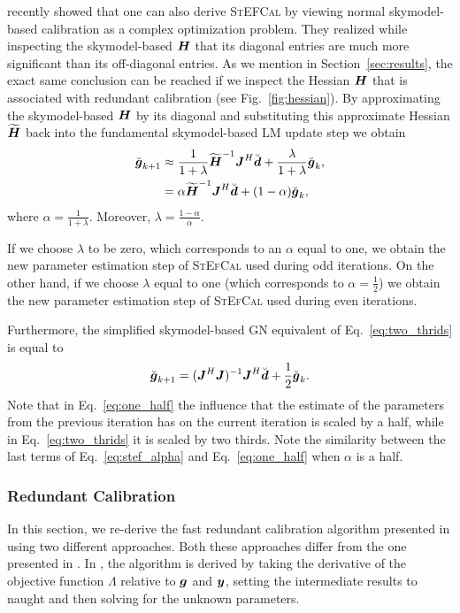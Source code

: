 \documentclass[useAMS,usenatbib]{mn2e}
\newcommand{\bg}{\bmath{g}}
\newcommand{\bd}{\bmath{d}}
\newcommand{\by}{\bmath{y}}
\newcommand{\bJ}{\bmath{J}}
\newcommand{\bH}{\bmath{H}}
\begin{document}
\citet{Smirnov2015} recently showed that one can also derive \textsc{StEFCal} by viewing normal skymodel-based calibration as a complex optimization problem.
They realized while inspecting the skymodel-based $\bH$ that its diagonal entries are much more significant than its off-diagonal entries.
As we mention in Section~\ref{sec:results}, the exact same conclusion can be reached if we inspect the Hessian $\bH$ that is associated with redundant calibration (see Fig.~\ref{fig:hessian}). 
By approximating the skymodel-based $\bH$ by its diagonal and substituting this approximate Hessian $\widetilde{\bH}$ back into the fundamental skymodel-based LM update step we obtain \citep{Smirnov2015} 
\begin{align}
\breve{\bg}_{k+1} &\approx \frac{1}{1+\lambda}\widetilde{\bH}^{-1}\bJ^H\breve{\bd} + \frac{\lambda}{1+\lambda} \breve{\bg}_k,\label{eq:stef_lambda}\\
 &= \alpha \widetilde{\bH}^{-1}\bJ^H\breve{\bd} + (1-\alpha)\breve{\bg}_k, \label{eq:stef_alpha}  
\end{align}
where $\alpha = \frac{1}{1+\lambda}$. Moreover, $\lambda = \frac{1-\alpha}{\alpha}$.

If we choose $\lambda$ to be zero, which corresponds to an $\alpha$ equal to one, we obtain the new parameter estimation step of \textsc{StEfCal} used during odd iterations. On the other hand, if we choose $\lambda$ equal to one (which corresponds
to $\alpha=\frac{1}{2}$) we obtain the new parameter estimation step of \textsc{StEfCal} used during even iterations. 

Furthermore, the simplified skymodel-based GN equivalent of Eq.~\eqref{eq:two_thrids} is equal to
\citep{Smirnov2015}
\begin{equation}
\label{eq:one_half}
\breve{\bg}_{k+1} = (\bJ^H\bJ)^{-1}\bJ^H\breve{\bd} + \frac{1}{2}\breve{\bg}_{k}. 
\end{equation}
Note that in Eq.~\eqref{eq:one_half} the influence that the estimate of the parameters from the previous iteration has on the current iteration is scaled by a half, while
in Eq.~\eqref{eq:two_thrids} it is scaled by two thirds. Note the similarity between the last terms of Eq.~\eqref{eq:stef_alpha} and Eq.~\eqref{eq:one_half} when $\alpha$ is a half.

\subsubsection{Redundant Calibration}
\label{sec:red_c}
In this section, we re-derive the fast redundant calibration algorithm presented in \citet{Marthi2014} using two different approaches. Both these approaches differ from the one presented in \citet{Marthi2014}. In \citet{Marthi2014}, the algorithm is derived by taking the derivative of the 
objective function $\Lambda$ relative to $\bg$ and $\by$, setting the intermediate results to naught and then solving for the unknown parameters. 
\end{document}
